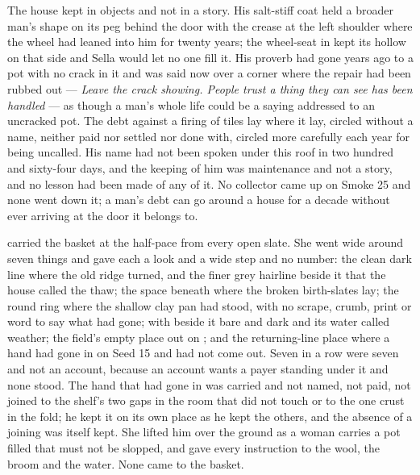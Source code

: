 The house kept  in objects and not in a story. His salt-stiff coat held a broader man's shape on its peg behind the door with the crease at the left shoulder where the wheel had leaned into him for twenty years; the wheel-seat in  kept its hollow on that side and Sella would let no one fill it. His proverb had gone years ago to a pot with no crack in it and was said now over a corner where the repair had been rubbed out --- \emph{Leave the crack showing. People trust a thing they can see has been handled} --- as though a man's whole life could be a saying addressed to an uncracked pot. The debt against a firing of tiles lay where it lay, circled without a name, neither paid nor settled nor done with, circled more carefully each year for being uncalled. His name had not been spoken under this roof in two hundred and sixty-four days, and the keeping of him was maintenance and not a story, and no lesson had been made of any of it. No collector came up  on Smoke 25 and none went down it; a man's debt can go around a house for a decade without ever arriving at the door it belongs to.

 carried the basket at the half-pace from every open slate. She went wide around seven things and gave each a look and a wide step and no number: the clean dark line where the old ridge turned, and the finer grey hairline beside it that the house called the thaw; the space beneath  where the broken birth-slates lay; the round ring where the shallow clay pan had stood, with no scrape, crumb, print or word to say what had gone;  with  beside it bare and dark and its water called weather; the field's empty place out on ; and the returning-line place where a hand had gone in on Seed 15 and had not come out. Seven in a row were seven and not an account, because an account wants a payer standing under it and none stood. The hand that had gone in was carried and not named, not paid, not joined to the shelf's two gaps in the room that did not touch or to the one crust in the fold; he kept it on its own place as he kept the others, and the absence of a joining was itself kept. She lifted him over the ground as a woman carries a pot filled that must not be slopped, and gave every instruction to the wool, the broom and the water. None came to the basket.

\scenebreak

